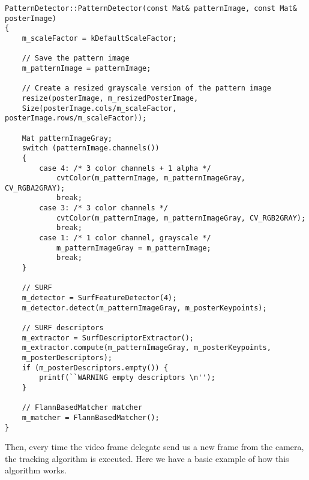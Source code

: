 \begin{verbatim}
PatternDetector::PatternDetector(const Mat& patternImage, const Mat&
posterImage)
{
    m_scaleFactor = kDefaultScaleFactor;
    
    // Save the pattern image
    m_patternImage = patternImage;
    
    // Create a resized grayscale version of the pattern image
    resize(posterImage, m_resizedPosterImage,
    Size(posterImage.cols/m_scaleFactor, posterImage.rows/m_scaleFactor));
    
    Mat patternImageGray;
    switch (patternImage.channels())
    {
        case 4: /* 3 color channels + 1 alpha */
            cvtColor(m_patternImage, m_patternImageGray, CV_RGBA2GRAY);
            break;
        case 3: /* 3 color channels */
            cvtColor(m_patternImage, m_patternImageGray, CV_RGB2GRAY);
            break;
        case 1: /* 1 color channel, grayscale */
            m_patternImageGray = m_patternImage;
            break;
    }
        
    // SURF
    m_detector = SurfFeatureDetector(4);
    m_detector.detect(m_patternImageGray, m_posterKeypoints);
        
    // SURF descriptors
    m_extractor = SurfDescriptorExtractor();
    m_extractor.compute(m_patternImageGray, m_posterKeypoints, 
    m_posterDescriptors);    
    if (m_posterDescriptors.empty()) {
        printf(``WARNING empty descriptors \n'');
    }
    
    // FlannBasedMatcher matcher    
    m_matcher = FlannBasedMatcher();
}
\end{verbatim}

Then, every time the video frame delegate send us a new frame from the camera,
the tracking algorithm is executed. Here we have a basic example of how this
algorithm works.

